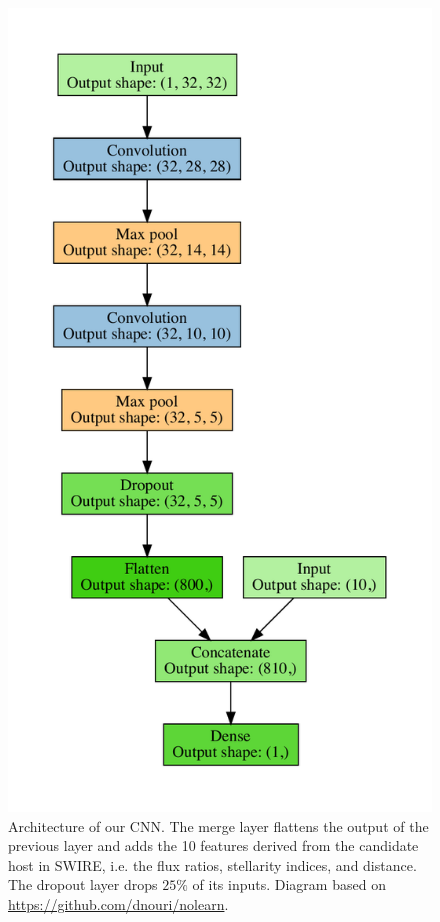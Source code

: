 \documentclass[fleqn,usenatbib,usedcolumn]{mnras}
\begin{document}
\begin{figure}
        \includegraphics[width=\linewidth]{images/cnn_model_graph}
        \caption{Architecture of our CNN. The merge layer flattens the output of
          the previous layer and adds the 10 features derived from the
          candidate host in SWIRE, i.e. the flux ratios, stellarity indices,
          and distance. The dropout layer drops $25\%$ of its
          inputs. Diagram based on \url{
          https://github.com/dnouri/nolearn}.}
        \label{fig:cnn}
      \end{figure}
\end{document}
